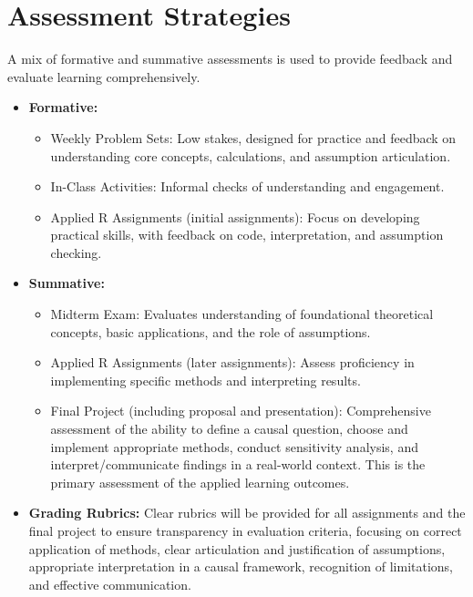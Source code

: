 \documentclass[10.5pt]{article}
\begin{document}
\section{Assessment Strategies}
A mix of formative and summative assessments is used to provide feedback and evaluate learning comprehensively.
\begin{itemize}
    \item \textbf{Formative:}
    \begin{itemize}
        \item Weekly Problem Sets: Low stakes, designed for practice and feedback on understanding core concepts, calculations, and assumption articulation.
        \item In-Class Activities: Informal checks of understanding and engagement.
        \item Applied R Assignments (initial assignments): Focus on developing practical skills, with feedback on code, interpretation, and assumption checking.
    \end{itemize}
    \item \textbf{Summative:}
    \begin{itemize}
        \item Midterm Exam: Evaluates understanding of foundational theoretical concepts, basic applications, and the role of assumptions.
        \item Applied R Assignments (later assignments): Assess proficiency in implementing specific methods and interpreting results.
        \item Final Project (including proposal and presentation): Comprehensive assessment of the ability to define a causal question, choose and implement appropriate methods, conduct sensitivity analysis, and interpret/communicate findings in a real-world context. This is the primary assessment of the applied learning outcomes.
    \end{itemize}
    \item \textbf{Grading Rubrics:} Clear rubrics will be provided for all assignments and the final project to ensure transparency in evaluation criteria, focusing on correct application of methods, clear articulation and justification of assumptions, appropriate interpretation in a causal framework, recognition of limitations, and effective communication.
\end{itemize}
\end{document}
